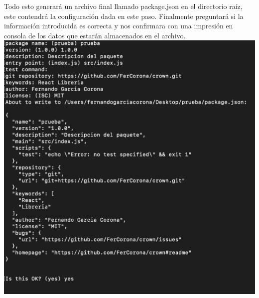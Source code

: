 Todo esto generará un archivo final llamado package.json en el directorio raíz, este contendrá la configuración dada en este paso.
Finalmente preguntará si la información introducida es correcta  y nos confirmara con una impresión en consola de los datos que estarán almacenados en el archivo.
\newline
\newline
\newline
\includegraphics[width=1\textwidth]{./Imagenes/image9.png}
\newline


